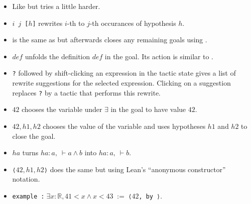 \documentclass[a4paper]{article}
\newcommand{\R}{\mathbb{R}}
\begin{document}

\begin{itemize}
    \item Like \texttt{\rw} but tries a little harder.
\end{itemize}


\begin{itemize}
    \item \texttt{\nthrw $i$ $j$ [$h$]} rewrites $i$-th to $j$-th occurances of hypothesis $h$.
\end{itemize}


\begin{itemize}
    \item \rwa is the same as \rw but afterwards closes any remaining goals using \assumption.
\end{itemize}


\begin{itemize}
    \item \texttt{\unfold $def$} unfolds the definition $def$ in the goal. Its action is similar to \texttt{\rw [$def$]}.
    \item \texttt{\unfold?} followed by shift-clicking an expression in the tactic state gives a list of rewrite suggestions for the selected expression. Clicking on a suggestion replaces \texttt{\unfold?} by a tactic that performs this rewrite.
\end{itemize}



\begin{itemize}
    \item \texttt{\use $42$} chooses the variable under $\exists$ in the goal to have value $42$.
    \item \texttt{\use $42, h1, h2$} chooses the value of the variable and uses hypotheses $h1$ and $h2$ to close the goal.
    \item \texttt{\use $ha$} turns $ha : a, \ \vdash a \wedge b$ into $ha: a, \ \vdash b$.
    \item \texttt{⟨$42, h1, h2$⟩} does the same but using Lean's ``anonymous constructor'' notation.
    \item \texttt{example :$\;\exists x : \R, 41 < x \wedge x < 43 \; := \; $⟨$42$, by \normnum⟩}.
\end{itemize}
\end{document}
